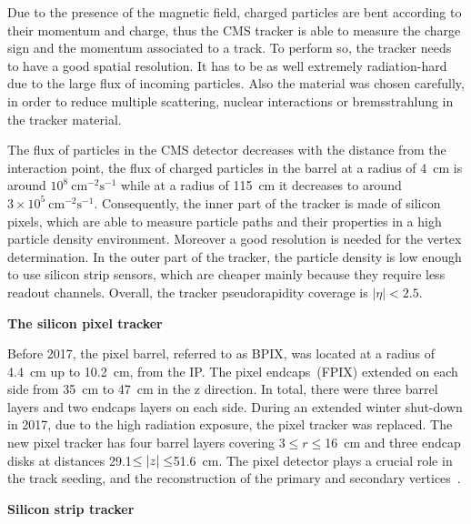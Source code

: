 Due to the presence of the magnetic field, charged particles are bent according to their momentum and charge, thus the CMS tracker is able to measure the charge sign and the momentum associated to a track. To perform so, the tracker needs to have a good spatial resolution. It has to be as well extremely radiation-hard due to the large flux of incoming particles. Also the material was chosen carefully, in order to reduce multiple scattering, nuclear interactions or bremsstrahlung in the tracker material.

The flux of particles in the CMS detector decreases with the distance from the interaction point, the flux of charged particles in the barrel at a radius of 4~cm is around $10^{8}~\mathrm{cm^{-2}s^{-1}}$ while at a radius of 115~cm it decreases to around $3 \times10^{5}~\mathrm{cm^{-2}s^{-1}}$. Consequently, the inner part of the tracker is made of silicon pixels, which are able to measure particle paths and their properties in a high particle density environment. Moreover a good resolution is needed for the vertex determination. In the outer part of the tracker, the particle density is low enough to use silicon strip sensors, which are cheaper mainly because they require less readout channels. Overall, the tracker pseudorapidity coverage is  $|\eta| < 2.5$.


\textbf{The silicon pixel tracker}

Before 2017, the pixel barrel, referred to as BPIX,  was located at a radius of 4.4~cm up to 10.2~cm, from the IP. The pixel endcaps~(FPIX) extended on each side from 35~cm to 47~cm in the z direction. In total, there were three barrel layers and two endcaps layers on each side. During an extended winter shut-down in 2017, due to the high radiation exposure, the pixel tracker was replaced. The new pixel tracker has four barrel layers covering 3$\leq r \leq$16~cm and three endcap disks at distances  29.1$\leq \abs{z} \leq$51.6~cm. The pixel detector plays a crucial role in the track seeding, and the reconstruction of the primary and secondary vertices~\cite{CMS:2012sda}. 



\textbf{Silicon strip tracker}


